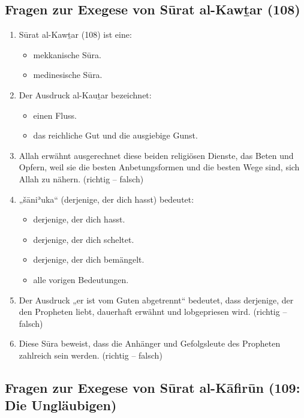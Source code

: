\subsection*{Fragen zur Exegese von Sūrat al-Kawṯar (108)}

\begin{enumerate}[leftmargin=1.6em,resume]
\item Sūrat al-Kawṯar (108) ist eine:
  \begin{itemize}
    \item mekkanische Sūra. \item medinesische Sūra.
  \end{itemize}
\item Der Ausdruck al-Kauṯar bezeichnet:
  \begin{itemize}
    \item einen Fluss. \item das reichliche Gut und die ausgiebige Gunst.
  \end{itemize}
\item Allah erwähnt ausgerechnet diese beiden religiösen Dienste, das Beten und Opfern, weil
  sie die besten Anbetungsformen und die besten Wege sind, sich Allah zu nähern.
  (richtig -- falsch)
\item „šāniʾuka“ (derjenige, der dich hasst) bedeutet:
  \begin{itemize}
    \item derjenige, der dich hasst. \item derjenige, der dich scheltet.
    \item derjenige, der dich bemängelt. \item alle vorigen Bedeutungen.
  \end{itemize}
\item Der Ausdruck „er ist vom Guten abgetrennt“ bedeutet, dass derjenige, der den Propheten
   liebt, dauerhaft erwähnt und lobgepriesen wird. (richtig -- falsch)
\item Diese Sūra beweist, dass die Anhänger und Gefolgsleute des Propheten  zahlreich
  sein werden. (richtig -- falsch)
\end{enumerate}

\subsection*{Fragen zur Exegese von Sūrat al-Kāfirūn (109: Die Ungläubigen)}

